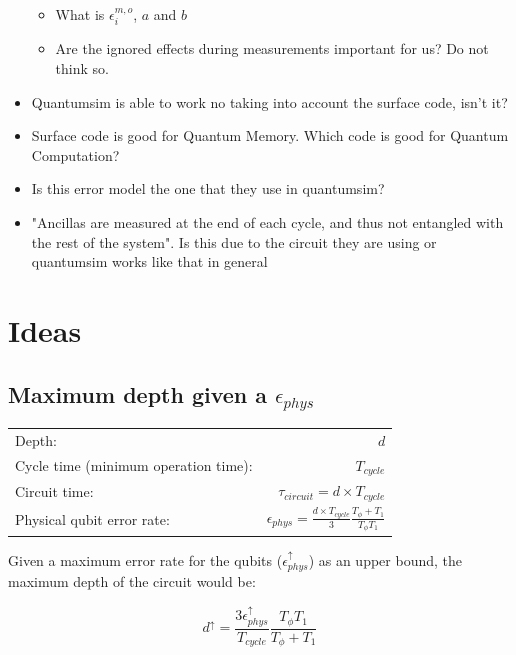 \documentclass[11pt]{article}
\begin{document}
\begin{itemize}
\begin{itemize}
\item What is \(\epsilon_i^{m,o}\), \(a\) and \(b\)
\item Are the ignored effects during measurements important for us? Do not think so.
\end{itemize}
\item Quantumsim is able to work no taking into account the surface code, isn't it?
\item Surface code is good for Quantum Memory. Which code is good for Quantum Computation?
\item Is this error model the one that they use in quantumsim?
\item "Ancillas are measured at the end of each cycle, and thus not entangled with the rest of the system". Is this due to the circuit they are using or quantumsim works like that in general
\end{itemize}


\section{Ideas}
\label{sec:org684a213}



\subsection{Maximum depth given a \(\epsilon_{phys}\)}
\label{sec:orgbb99cf5}

\begin{center}
\begin{tabular}{lr}
Depth: & \(d\)\\
Cycle time (minimum operation time): & \(T_{cycle}\)\\
Circuit time: & \(\tau_{circuit} = d \times T_{cycle}\)\\
Physical qubit error rate: & \(\epsilon_{phys} = \frac{d \times T_{cycle}}{3} \frac{T_{\phi} + T_1}{T_{\phi} T_1}\)\\
\end{tabular}
\end{center}

Given a maximum error rate for the qubits (\(\epsilon_{phys}^{\uparrow}\)) as an upper bound, the maximum depth of the circuit would be:

$$d^{\uparrow} = \frac{3 \epsilon_{phys}^{\uparrow}}{T_{cycle}} \frac{T_{\phi} T_1}{T_{\phi} + T_1}$$



\end{document}

